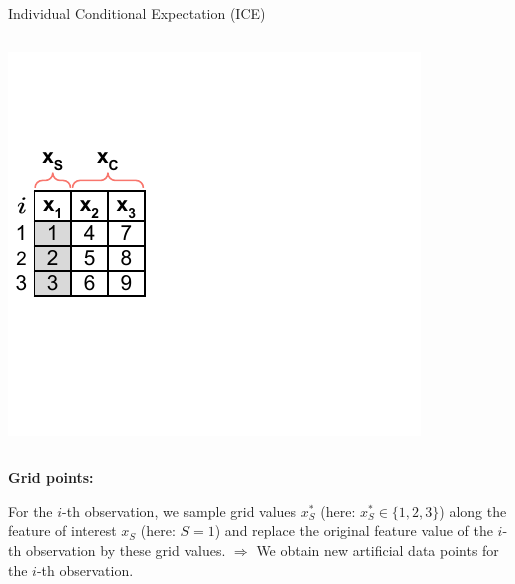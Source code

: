 \documentclass[11pt,compress,t,notes=noshow, aspectratio=169, xcolor=table]{beamer}
\begin{document}
\begin{vbframe}{Individual Conditional Expectation (ICE)}

\begin{columns}[T]
\begin{column}{0.45\textwidth}
\includegraphics[page=2, trim=0cm 0.35cm 0.85cm 0.35cm, width=\textwidth]{figure_man/ice_plot_demo}
\end{column}
\begin{column}{0.55\textwidth}

\end{column}
\end{columns}
\vspace*{\topsep}

\textbf{Grid points:}

For the $i$-th observation, we sample grid values $x_S^*$ (here: $x_S^* \in \{1, 2, 3\}$) along the feature of interest $x_S$ (here: $S = 1$) and replace the original feature value of the $i$-th observation by these grid values. \newline
$\Rightarrow$ We obtain new artificial data points for the $i$-th observation.


\framebreak


\end{vbframe}
\end{document}
